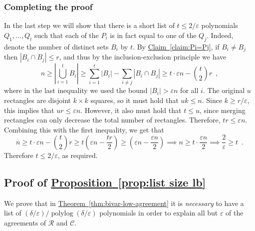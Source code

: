 \documentclass[11pt]{article}
\numberwithin{equation}{section}
\theoremstyle{definition}
\theoremstyle{plain}
\newcommand{\expref}[2]{\hyperref[#2]{#1~\ref{#2}}}
\theoremstyle{plain}
\newcommand{\colored}{}
\newcommand{\blocklength}{\colored{n}} %
\newcommand{\degree}{\colored{r}}
\newcommand{\rowpoly}{\colored{\mathcal R}}
\newcommand{\colpoly}{\colored{\mathcal C}}
\newcommand{\prox}{\colored{\delta}}
\newcommand{\numrect}{\colored{u}}
\newcommand{\polylog}{\operatorname{polylog}}
\newcommand{\eps}{\varepsilon}
\newcommand\abs[1]{\colored{\left|#1\right|}}
\begin{document}
    \subsubsection{Completing the proof}

    In the last step we will show that there is a short list of $t \leq {2}/{\eps}$
    polynomials $Q_1,\dots, Q_t$ such that each of the
%
$P_i$ is in fact equal to one of the $Q_j$.   %
%
 Indeed, denote the number of distinct sets $B_i$ by $t$. %
    By \expref{Claim}{claim:Pi=Pj}, if $B_i \neq B_j$ then $|B_i \cap B_j| \leq \degree$,
    and thus by the inclusion-exclusion principle we have
    \begin{equation*}
      \blocklength \geq \abs{ \bigcup_{i=1}^t B_i } \geq \sum_{i=1}^t \abs{B_i} - \sum_{i \neq j} \abs{B_i \cap B_j}
      \geq t \cdot \eps \blocklength - \binom{t}{2} \degree \enspace,
    \end{equation*}
    where in the last inequality we used the bound $\abs{B_i} > \eps \blocklength$ for all $i$. The original $\numrect$ rectangles are disjoint $k \times k$ squares, so it must hold that $\numrect k \leq n$. Since $k \geq {\degree}/{\eps}$, this implies that $\numrect \degree \leq \eps n$. However, it also must hold that $t \leq \numrect$, since merging rectangles can only decrease the total number of rectangles. Therefore, $t \degree \leq \eps \blocklength$. Combining this with the first inequality, we get that
    \begin{equation*}
    \blocklength \geq t \cdot \eps \blocklength - {t \choose 2} \degree \geq t \left(\eps \blocklength - \frac{t \degree}{2} \right) \geq \left(\eps \blocklength - \frac{\eps \blocklength}{2}\right) \implies \blocklength \geq t \cdot \frac{\eps \blocklength}{2} \implies \frac{2}{\eps} \geq t \enspace.
    \end{equation*}
    Therefore $t \leq {2}/{\eps}$, as required.


%
%

\subsection{Proof of \expref{Proposition}{prop:list size lb}}
\label{sec:prop-proof}

We prove that in \expref{Theorem}{thm:bivar-low-agreement} it is \emph{necessary} to have a list of ${(\prox/\eps)}/{\polylog(\prox/\eps)}$ polynomials in order to explain all but $\eps$ of the agreements of $\rowpoly$ and $\colpoly$.

\medskip
\end{document}
